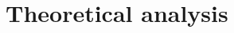 \documentclass[10pt,journal,compsoc]{IEEEtran}
\newcommand{\bds}{\boldsymbol}
\newcommand{\M}[1]{{{\mathbf{\MakeUppercase{#1}}}}}
\numberwithin{equation}{section}
\begin{document}
\section{Theoretical analysis}\label{sec:3}
\label{sec:T}

\end{document}
